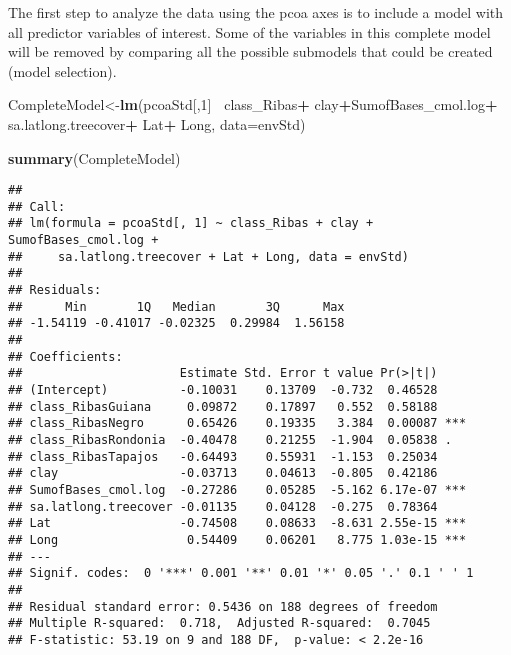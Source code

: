 \documentclass[]{article}
\newenvironment{Shaded}{\begin{snugshade}}{\end{snugshade}}
\newcommand{\DataTypeTok}[1]{\textcolor[rgb]{0.13,0.29,0.53}{#1}}
\newcommand{\DecValTok}[1]{\textcolor[rgb]{0.00,0.00,0.81}{#1}}
\newcommand{\KeywordTok}[1]{\textcolor[rgb]{0.13,0.29,0.53}{\textbf{#1}}}
\newcommand{\NormalTok}[1]{#1}
\newcommand{\OperatorTok}[1]{\textcolor[rgb]{0.81,0.36,0.00}{\textbf{#1}}}
\newcommand{\StringTok}[1]{\textcolor[rgb]{0.31,0.60,0.02}{#1}}
\begin{document}
The first step to analyze the data using the pcoa axes is to include a
model with all predictor variables of interest. Some of the variables in
this complete model will be removed by comparing all the possible
submodels that could be created (model selection).

\begin{Shaded}
\begin{Highlighting}[]
\NormalTok{CompleteModel<-}\KeywordTok{lm}\NormalTok{(pcoaStd[,}\DecValTok{1}\NormalTok{]}\OperatorTok{~}
\StringTok{                    }\NormalTok{class_Ribas}\OperatorTok{+}
\StringTok{                    }\NormalTok{clay}\OperatorTok{+}\NormalTok{SumofBases_cmol.log}\OperatorTok{+}
\StringTok{                    }\NormalTok{sa.latlong.treecover}\OperatorTok{+}
\StringTok{                    }\NormalTok{Lat}\OperatorTok{+}
\StringTok{                    }\NormalTok{Long,}
                  \DataTypeTok{data=}\NormalTok{envStd)}
  

\KeywordTok{summary}\NormalTok{(CompleteModel)}
\end{Highlighting}
\end{Shaded}

\begin{verbatim}
## 
## Call:
## lm(formula = pcoaStd[, 1] ~ class_Ribas + clay + SumofBases_cmol.log + 
##     sa.latlong.treecover + Lat + Long, data = envStd)
## 
## Residuals:
##      Min       1Q   Median       3Q      Max 
## -1.54119 -0.41017 -0.02325  0.29984  1.56158 
## 
## Coefficients:
##                      Estimate Std. Error t value Pr(>|t|)    
## (Intercept)          -0.10031    0.13709  -0.732  0.46528    
## class_RibasGuiana     0.09872    0.17897   0.552  0.58188    
## class_RibasNegro      0.65426    0.19335   3.384  0.00087 ***
## class_RibasRondonia  -0.40478    0.21255  -1.904  0.05838 .  
## class_RibasTapajos   -0.64493    0.55931  -1.153  0.25034    
## clay                 -0.03713    0.04613  -0.805  0.42186    
## SumofBases_cmol.log  -0.27286    0.05285  -5.162 6.17e-07 ***
## sa.latlong.treecover -0.01135    0.04128  -0.275  0.78364    
## Lat                  -0.74508    0.08633  -8.631 2.55e-15 ***
## Long                  0.54409    0.06201   8.775 1.03e-15 ***
## ---
## Signif. codes:  0 '***' 0.001 '**' 0.01 '*' 0.05 '.' 0.1 ' ' 1
## 
## Residual standard error: 0.5436 on 188 degrees of freedom
## Multiple R-squared:  0.718,  Adjusted R-squared:  0.7045 
## F-statistic: 53.19 on 9 and 188 DF,  p-value: < 2.2e-16
\end{verbatim}
\end{document}
